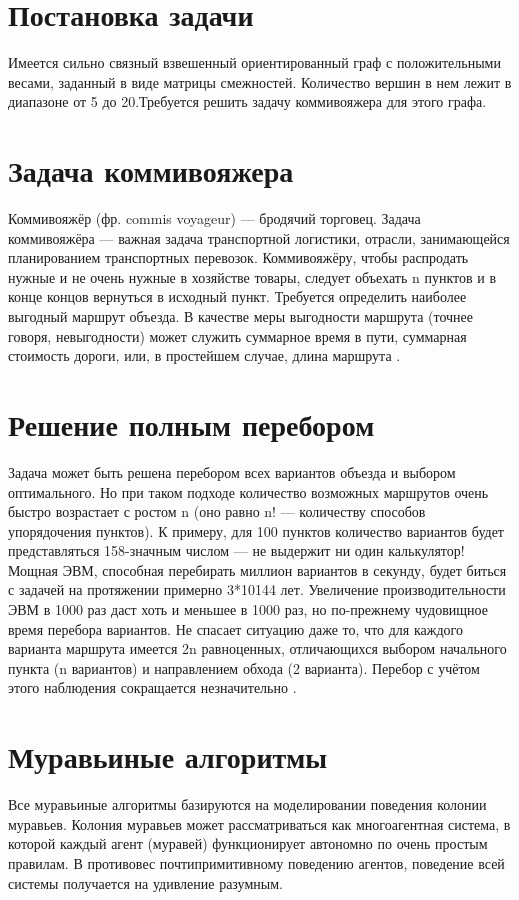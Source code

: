 \documentclass[12pt]{report}
\begin{document}
\section{Постановка задачи} 
Имеется сильно связный взвешенный ориентированный граф \cite{diskr} с положительными весами, заданный в виде матрицы смежностей. Количество вершин в нем лежит в диапазоне от 5 до 20.Требуется решить задачу коммивояжера для этого графа. 
\section{Задача коммивояжера}
Коммивояжёр (фр. commis voyageur) — бродячий торговец. Задача коммивояжёра — важная задача транспортной логистики, отрасли, занимающейся планированием транспортных перевозок. Коммивояжёру, чтобы распродать нужные и не очень нужные в хозяйстве товары, следует объехать n пунктов и в конце концов вернуться в исходный пункт. Требуется определить наиболее выгодный маршрут объезда. В качестве меры выгодности маршрута (точнее говоря, невыгодности) может служить суммарное время в пути, суммарная стоимость дороги, или, в простейшем случае, длина маршрута \cite{commi2}.

\section{Решение полным перебором}
Задача может быть решена перебором всех вариантов объезда и выбором оптимального. Но при таком подходе количество возможных маршрутов очень быстро возрастает с ростом n (оно равно n! — количеству способов упорядочения пунктов). К примеру, для 100 пунктов количество вариантов будет представляться 158-значным числом — не выдержит ни один калькулятор! Мощная ЭВМ, способная перебирать миллион вариантов в секунду, будет биться с задачей на протяжении примерно 3*10144 лет. Увеличение производительности ЭВМ в 1000 раз даст хоть и меньшее в 1000 раз, но по-прежнему чудовищное время перебора вариантов. Не спасает ситуацию даже то, что для каждого варианта маршрута имеется 2n равноценных, отличающихся выбором начального пункта (n вариантов) и направлением обхода (2 варианта). Перебор с учётом этого наблюдения сокращается незначительно \cite{commi}. %
\section{Муравьиные алгоритмы}
Все муравьиные алгоритмы базируются на моделировании поведения колонии муравьев. Колония муравьев может рассматриваться как многоагентная система, в которой каждый агент (муравей) функционирует автономно по очень простым правилам. В противовес почтипримитивному поведению агентов, поведение всей системы получается на удивление разумным.
\end{document}
